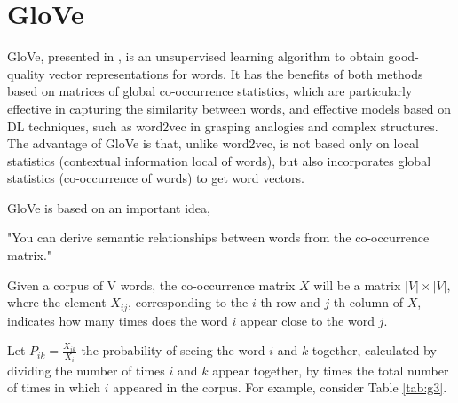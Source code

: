 \newpage

\section{GloVe}

\ac{GloVe}, presented in \cite{glove}, is an unsupervised learning algorithm to obtain good-quality vector representations for words. It has the benefits of both methods based on matrices of global co-occurrence statistics, which are particularly effective in capturing the similarity between words, and effective models based on \ac{DL} techniques, such as word2vec in grasping analogies and complex structures. The advantage of \ac{GloVe} is that, unlike word2vec, is not based only on local statistics (contextual information local of words), but also incorporates global statistics (co-occurrence of words) to get word vectors. 

GloVe is based on an important idea,

\begin{displayquote}
\centering
"You can derive semantic relationships between words from the co-occurrence matrix."
\end{displayquote}

Given a corpus of V words, the co-occurrence matrix $X$ will be a matrix $|V| \times |V|$, where the element $X_{ij}$, corresponding to the $i$-th row and $j$-th column of $X$, indicates how many times does the word $i$ appear close to the word $j$.


Let $P_{ik} = \frac{X_{ik}}{X_i}$ the probability of seeing the word $i$ and $k$ together, calculated by dividing the number of times $i$ and $k$ appear together, by times the total number of times in which $i$ appeared in the corpus. For example, consider Table \ref{tab:g3}.

